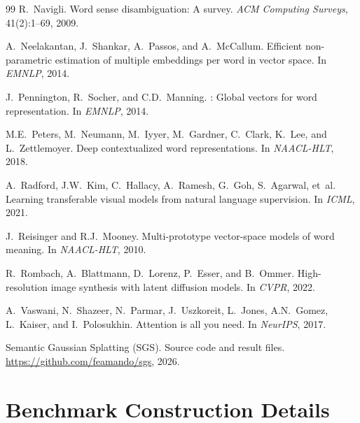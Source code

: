 \documentclass[twoside,11pt]{article}
\begin{document}
\begin{thebibliography}{99}
R.~Navigli.
\newblock Word sense disambiguation: A survey.
\newblock \emph{ACM Computing Surveys}, 41(2):1--69, 2009.

A.~Neelakantan, J.~Shankar, A.~Passos, and A.~McCallum.
\newblock Efficient non-parametric estimation of multiple embeddings per word in vector space.
\newblock In \emph{EMNLP}, 2014.

J.~Pennington, R.~Socher, and C.D.~Manning.
: Global vectors for word representation.
\newblock In \emph{EMNLP}, 2014.

M.E.~Peters, M.~Neumann, M.~Iyyer, M.~Gardner, C.~Clark, K.~Lee, and L.~Zettlemoyer.
\newblock Deep contextualized word representations.
\newblock In \emph{NAACL-HLT}, 2018.

A.~Radford, J.W.~Kim, C.~Hallacy, A.~Ramesh, G.~Goh, S.~Agarwal, et~al.
\newblock Learning transferable visual models from natural language supervision.
\newblock In \emph{ICML}, 2021.

J.~Reisinger and R.J.~Mooney.
\newblock Multi-prototype vector-space models of word meaning.
\newblock In \emph{NAACL-HLT}, 2010.

R.~Rombach, A.~Blattmann, D.~Lorenz, P.~Esser, and B.~Ommer.
\newblock High-resolution image synthesis with latent diffusion models.
\newblock In \emph{CVPR}, 2022.

A.~Vaswani, N.~Shazeer, N.~Parmar, J.~Uszkoreit, L.~Jones, A.N.~Gomez, L.~Kaiser, and I.~Polosukhin.
\newblock Attention is all you need.
\newblock In \emph{NeurIPS}, 2017.

Semantic {G}aussian {S}platting (SGS).
\newblock Source code and result files.
\newblock \url{https://github.com/feamando/sgs}, 2026.

\end{thebibliography}

\appendix

\section{Benchmark Construction Details}
\label{app:bench}
\end{document}
